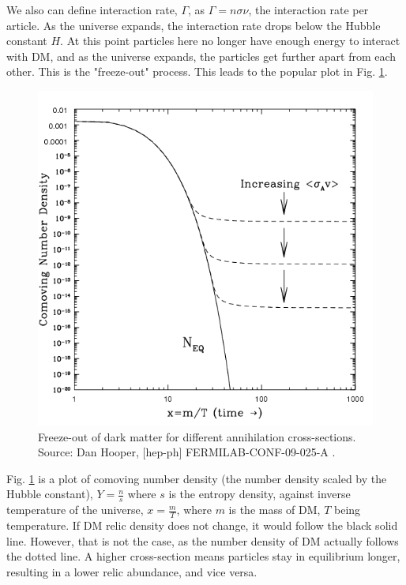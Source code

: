 \documentclass[12pt]{article}
\begin{document}
We also can define interaction rate, $\Gamma$, as $\Gamma = n\sigma\nu$, the interaction rate per article. As the universe expands, the interaction rate drops below the Hubble constant $H$. At this point particles here no longer have enough energy to interact with DM, and as the universe expands, the particles get further apart from each other. This is the "freeze-out" process. This leads to the popular plot in Fig. \ref{fig:freezeout}.

\begin{figure}
    \includegraphics[width=\linewidth]{Documents/Thesis/Figs/Thermal-freeze-out-of-dark-matter-for-different-annihilation-cross-sections-c-Dan.jpg}
    \caption{Freeze-out of dark matter for different annihilation cross-sections. Source: Dan Hooper, [hep-ph] FERMILAB-CONF-09-025-A \cite{hooper2009tasi2008lecturesdark}.}
    \label{fig:freezeout}
\end{figure}

Fig. \ref{fig:freezeout} is a plot of comoving number density (the number density scaled by the Hubble constant), $Y = \frac{n}{s}$ where $s$ is the entropy density, against inverse temperature of the universe, $x = \frac{m}{T}$, where $m$ is the mass of DM, $T$ being temperature. If DM relic density does not change, it would follow the black solid line. However, that is not the case, as the number density of DM actually follows the dotted line. A higher cross-section means particles stay in equilibrium longer, resulting in a lower relic abundance, and vice versa.
\end{document}
